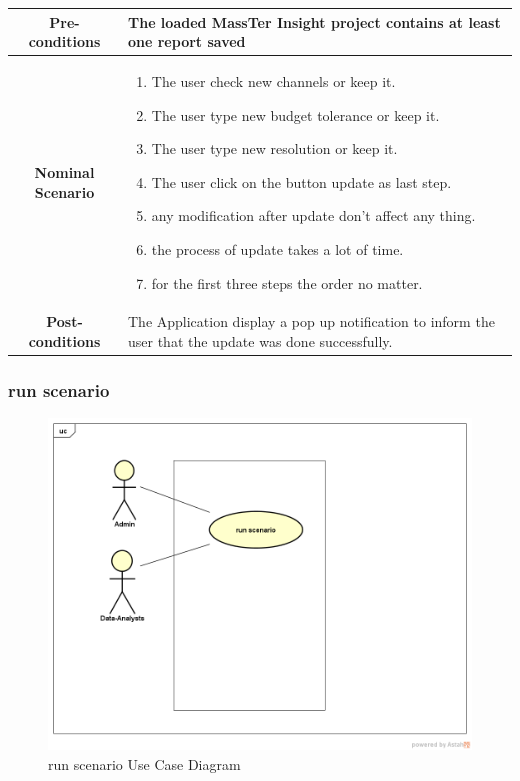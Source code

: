     \begin{table}
  	\centering
  	\begin{tabular}{|c|p{10cm}|}
  		\hline 	
  		\textbf{Pre-conditions } &The loaded MassTer Insight project contains at least one report saved \\ 
  		\hline                     
  		\textbf{Nominal Scenario } & \begin{enumerate}
  			\item The user check new channels or keep it.
  			\item The user type new budget tolerance or keep it.
  			\item The user type new resolution or keep it. 
  			\item The user click on the button update as last step.
  			\item any modification after update don't affect any thing.
  			\item the process of update takes a lot of time.
  			\item for the first three steps the order no matter.   
  		\end{enumerate} \\ 
  		\hline 
  		\textbf{Post-conditions} & The Application display a pop up notification to inform the user that the update was done successfully. \\
  		\hline 
  	\end{tabular}
  \end{table}
 \clearpage
 \newpage
	 \subsubsection{run scenario}
	 	\begin{figure}[h]
	 	\centering
	 	\includegraphics[width=1.0\textwidth]{runScenario.png}
	 	\caption{run scenario Use Case Diagram}
	 	
	 \end{figure}
 
